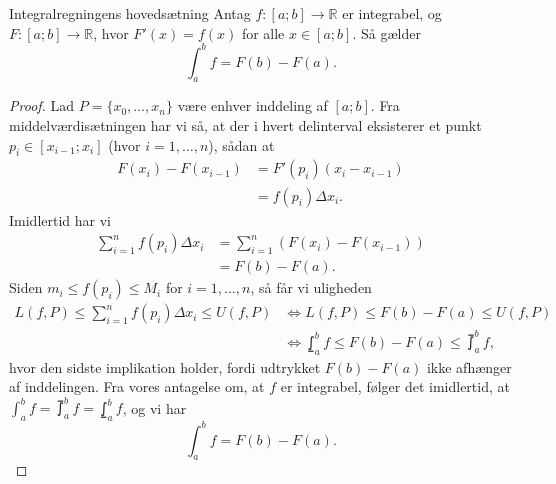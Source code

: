 \begin{theorem}[label=theo:hovedsætning]{Integralregningens hovedsætning}{}
  Antag $f:[a;b] \to \mathbb{R}$ er integrabel, og $F:[a;b] \to \mathbb{R} $, hvor $F'(x)=f(x)$ for alle $x \in [a;b]$. 
  Så gælder 
  \[
  \int_{a}^{b} f =F(b)-F(a).
  \] 
\end{theorem}
\begin{proof} 
  Lad $P=\{ x_0, \ldots , x_n \} $ være enhver inddeling af $[a;b]$. 
  Fra middelværdisætningen har vi så, at der i hvert delinterval eksisterer et punkt $p_i \in [x _{i-1};x_i]$ (hvor $i=1,\ldots , n$), sådan at
  \begin{equation*}
  \begin{split}
    F(x_i)-F(x_{i-1}) &=F'(p_i) \left(x_i- x _{i-1}\right)\\
    &=f(p_i)\Delta x_i.
  \end{split}
  \end{equation*}
  Imidlertid har vi
  \begin{equation*}
  \begin{split}
    \sum_{i =1}^{n} f(p_i)\Delta x_i &= \sum_{i =1}^{n} \left(F(x_i) - F(x _{i-1})\right) \\
    &=F(b)-F(a).
  \end{split}
  \end{equation*}
  Siden $m_i \leq f(p_i) \leq M_i$ for $i=1, \ldots , n$, så får vi uligheden
  \begin{equation*}
  \begin{split}
    L(f, P) \leq \sum_{i =1}^{n} f(p_i) \Delta x_i \leq U(f, P) &\iff L(f, P) \leq F(b)-F(a) \leq U(f, P)\\
    &\iff \lowint_{a}^{b} f \leq F(b) -F(a) \leq \upint_{a}^{b} f,
  \end{split}
  \end{equation*}
  hvor den sidste implikation holder, fordi udtrykket $F(b)-F(a)$ ikke afhænger af inddelingen. 
  Fra vores antagelse om, at $f$ er integrabel, følger det imidlertid, at $\int_{a}^{b} f= \upint_{a}^{b} f=\lowint_{a}^{b} f$, og vi har
  \[
  \int_{a}^{b} f =F(b)-F(a).
  \] 
\end{proof}

